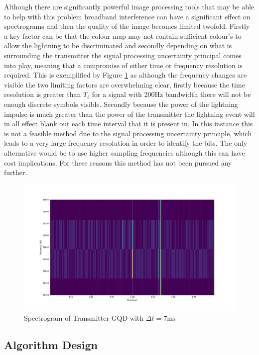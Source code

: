 Although there are significantly powerful image processing tools that may be able to help with this problem broadband interference can have a significant effect on spectrograms and then the quality of the image becomes limited twofold. Firstly a key factor can be that the colour map may not contain sufficient colour's to allow the lightning to be discriminated and secondly depending on what is surrounding the transmitter the signal processing uncertainty principal comes into play, meaning that a compromise of either time or frequency resolution is required. This is exemplified by Figure \ref{fig:gqdspect} as although the frequency changes are visible the two limiting factors are overwhelming clear, firstly because the time resolution is greater than $T_b$ for a signal with 200Hz bandwidth there will not be enough discrete symbols visible. Secondly because the power of the lightning impulse is much greater than the power of the transmitter the lightning event will in all effect blank out each time interval that it is present in. In this instance this is not a feasible method due to the signal processing uncertainty principle, which leads to a very large frequency resolution in order to identify the bits. The only alternative would be to use higher sampling frequencies although this can have cost implications. For these reasons this method has not been pursued any further.

\begin{figure}[h!]
    \centering
    \includegraphics[width = \textwidth]{figs/sim/symRecovery/GQDSpectrogram.png}
    \caption{Spectrogram of Transmitter GQD with $\Delta t = 7\si{\milli\second}$}
    \label{fig:gqdspect}
\end{figure}

\subsection{Algorithm Design}

